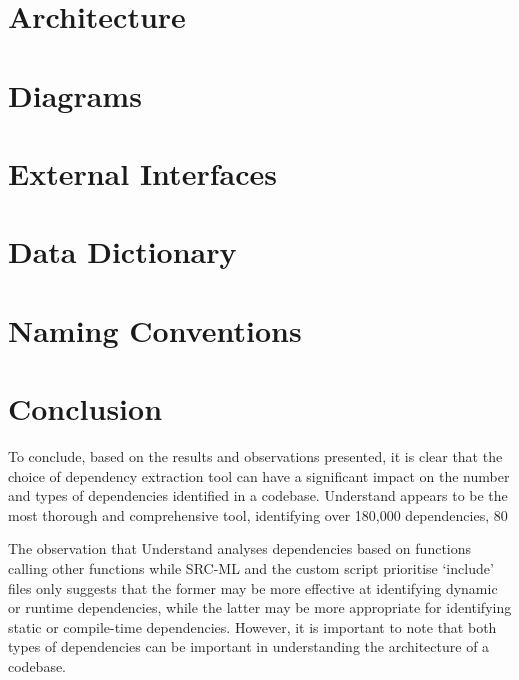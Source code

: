 \documentclass[12pt, dvipsnames, a4paper]{article}
\begin{document}
\section{Architecture}
\lipsum[1]

\section{Diagrams}
\lipsum[1]

\section{External Interfaces}
\lipsum[1]

\section{Data Dictionary}
\lipsum[1]

\section{Naming Conventions}
\lipsum[1]

\section{Conclusion}
To conclude, based on the results and observations presented, it is clear that the choice of dependency extraction tool can have a significant impact on the number and types of dependencies identified in a codebase. Understand appears to be the most thorough and comprehensive tool, identifying over 180,000 dependencies, 80%

The observation that Understand analyses dependencies based on functions calling other functions while SRC-ML and the custom script prioritise ‘include’ files only suggests that the former may be more effective at identifying dynamic or runtime dependencies, while the latter may be more appropriate for identifying static or compile-time dependencies. However, it is important to note that both types of dependencies can be important in understanding the architecture of a codebase.
\end{document}
